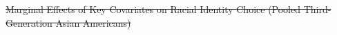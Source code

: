 \documentclass[12pt,english]{article}
\providecommand{\DIFdeltex}[1]{{\protect\color{red}\sout{#1}}}                      %
\providecommand{\DIFdelbegin}{} %
\providecommand{\DIFdelFL}[1]{\DIFdel{#1}} %
\providecommand{\DIFdel}[1]{\texorpdfstring{\DIFdeltex{#1}}{}} %
\newcommand{\DIFscaledelfig}{0.5}
\newlength{\DIFdelgraphicswidth} %
\newlength{\DIFdelgraphicsheight} %
\newcommand{\DIFdelincludegraphics}[2][]{%
\sbox{\DIFdelgraphicsbox}{\DIFOincludegraphics[#1]{#2}}%
\settoboxwidth{\DIFdelgraphicswidth}{\DIFdelgraphicsbox} %
\settoboxtotalheight{\DIFdelgraphicsheight}{\DIFdelgraphicsbox} %
\scalebox{\DIFscaledelfig}{%
\parbox[b]{\DIFdelgraphicswidth}{\usebox{\DIFdelgraphicsbox}\\[-\baselineskip] \rule{\DIFdelgraphicswidth}{0em}}\llap{\resizebox{\DIFdelgraphicswidth}{\DIFdelgraphicsheight}{%
\setlength{\unitlength}{\DIFdelgraphicswidth}%
\begin{picture}(1,1)%
\thicklines\linethickness{2pt} %
{\color[rgb]{1,0,0}\put(0,0){\framebox(1,1){}}}%
{\color[rgb]{1,0,0}\put(0,0){\line( 1,1){1}}}%
{\color[rgb]{1,0,0}\put(0,1){\line(1,-1){1}}}%
\end{picture}%
}\hspace*{3pt}}} %
} %
\DeclareRobustCommand{\DIFdelbegin}{\DIFOdelbegin \let\includegraphics\DIFdelincludegraphics} %
\begin{document}
\DIFdelbegin %
{%
\DIFdelFL{Marginal Effects of Key Covariates on Racial Identity Choice (Pooled Third-Generation Asian Americans)}}
\DIFdelFL{\label{fig:marginal-effects-third-pooled}
}%

\end{document}
